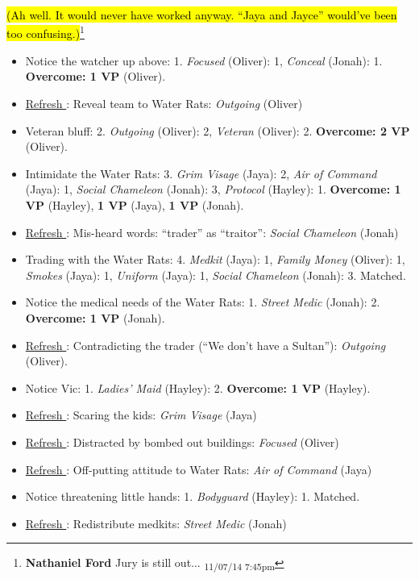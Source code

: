 \hl{(Ah well.  It would never have worked anyway.  ``Jaya and Jayce'' would've been too confusing.)}\footnote{\textbf{Nathaniel Ford }Jury is still out... \textsubscript{11/07/14 7:45pm}}





{
\parskip=0pt
\begin{itemize}
\item Notice the watcher up above: 1.  \textit{Focused} (Oliver): 1,\textit{ Conceal} (Jonah): 1.   \textbf{Overcome: 1 VP} (Oliver).
\item \underline{ Refresh }: Reveal team to Water Rats:\textit{ Outgoing} (Oliver)
\item Veteran bluff: 2.  \textit{Outgoing} (Oliver): 2,\textit{ Veteran} (Oliver): 2.  \textbf{Overcome: 2 VP} (Oliver).
\item Intimidate the Water Rats: 3.\textit{  Grim Visage} (Jaya): 2,\textit{ Air of Command} (Jaya): 1,\textit{ Social Chameleon} (Jonah): 3,\textit{ Protocol} (Hayley): 1.  \textbf{Overcome: 1 VP} (Hayley),\textbf{ 1 VP} (Jaya),\textbf{ 1 VP} (Jonah).
\item \underline{ Refresh }: Mis-heard words: ``trader'' as ``traitor'':\textit{ Social Chameleon} (Jonah)
\item Trading with the Water Rats: 4.\textit{  Medkit} (Jaya): 1,\textit{ Family Money} (Oliver): 1,  \textit{Smokes} (Jaya): 1,\textit{ Uniform} (Jaya): 1,\textit{ Social Chameleon} (Jonah): 3.  Matched.
\item Notice the medical needs of the Water Rats: 1.  \textit{Street Medic} (Jonah): 2.  \textbf{Overcome: 1 VP} (Jonah).
\item \underline{ Refresh }: Contradicting the trader (``We don't have a Sultan''):\textit{ Outgoing} (Oliver).
\item Notice Vic: 1.  \textit{Ladies' Maid} (Hayley): 2.  \textbf{Overcome: 1 VP} (Hayley).
\item \underline{ Refresh }: Scaring the kids:\textit{ Grim Visage} (Jaya)
\item \underline{ Refresh }: Distracted by bombed out buildings:\textit{ Focused} (Oliver)
\item \underline{ Refresh }: Off-putting attitude to Water Rats:\textit{ Air of Command} (Jaya)
\item Notice threatening little hands: 1.  \textit{Bodyguard} (Hayley): 1.  Matched.
\item \underline{ Refresh }: Redistribute medkits:\textit{ Street Medic} (Jonah)

\end{itemize}}
